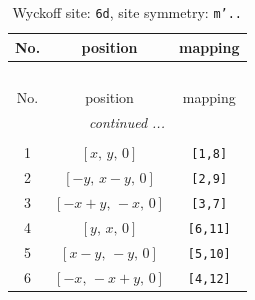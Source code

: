 \documentclass[fleqn,8pt]{jsarticle}
\begin{document}
\renewcommand{\arraystretch}{1.2}
\begin{longtable}{ccc}
\caption{Wyckoff site: {\tt 6d}, site symmetry: {\tt m'..}}
 \\
 \hline \hline
No. & position & mapping \\ \hline \endfirsthead

\multicolumn{2}{l}{\tablename\ \thetable{}} \\
 \hline \hline
No. & position & mapping \\ \hline \endhead

 \hline \hline
\multicolumn{2}{r}{\footnotesize\it continued ...} \\ \endfoot

 \hline \hline
\multicolumn{2}{r}{} \\ \endlastfoot

1 & $\left[ x,\, y,\, 0 \right]$ & {\tt [1,8]} \\ \hline
2 & $\left[ - y,\, x - y,\, 0 \right]$ & {\tt [2,9]} \\ \hline
3 & $\left[ - x + y,\, - x,\, 0 \right]$ & {\tt [3,7]} \\ \hline
4 & $\left[ y,\, x,\, 0 \right]$ & {\tt [6,11]} \\ \hline
5 & $\left[ x - y,\, - y,\, 0 \right]$ & {\tt [5,10]} \\ \hline
6 & $\left[ - x,\, - x + y,\, 0 \right]$ & {\tt [4,12]} \\
\end{longtable}
\renewcommand{\arraystretch}{1.2}
\end{document}
